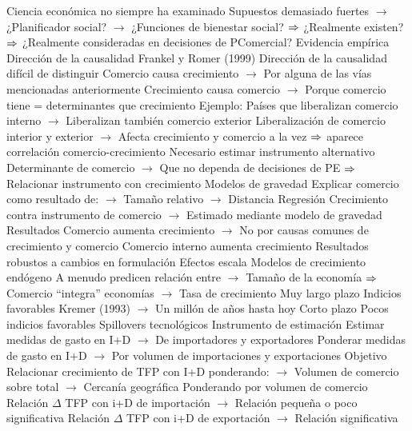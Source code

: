\documentclass{nuevotema}
\begin{document}
\begin{esquemal}
				\4 Ciencia económica no siempre ha examinado
				\4[] Supuestos demasiado fuertes
				\4[] $\to$ ¿Planificador social?
				\4[] $\to$ ¿Funciones de bienestar social?
				\4[] $\Rightarrow$ ¿Realmente existen?
				\4[] $\Rightarrow$ ¿Realmente consideradas en decisiones de PComercial?
		\2 Evidencia empírica
			\3 Dirección de la causalidad
				\4 Frankel y Romer (1999)
				\4 Dirección de la causalidad difícil de distinguir
				\4[] Comercio causa crecimiento
				\4[] $\to$ Por alguna de las vías mencionadas anteriormente
				\4[] Crecimiento causa comercio
				\4[] $\to$ Porque comercio tiene = determinantes que crecimiento
				\4 Ejemplo:
				\4[] Países que liberalizan comercio interno
				\4[] $\to$ Liberalizan también comercio exterior
				\4[] Liberalización de comercio interior y exterior
				\4[] $\to$ Afecta crecimiento y comercio a la vez
				\4[] $\Rightarrow$ aparece correlación comercio-crecimiento
				\4 Necesario estimar instrumento alternativo
				\4[] Determinante de comercio
				\4[] $\to$ Que no dependa de decisiones de PE
				\4[] $\Rightarrow$ Relacionar instrumento con crecimiento
				\4 Modelos de gravedad
				\4[] Explicar comercio como resultado de:
				\4[] $\to$ Tamaño relativo
				\4[] $\to$ Distancia
				\4 Regresión
				\4[] Crecimiento contra instrumento de comercio
				\4[] $\to$ Estimado mediante modelo de gravedad
				\4 Resultados
				\4[] Comercio aumenta crecimiento
				\4[] $\to$ No por causas comunes de crecimiento y comercio
				\4[] Comercio interno aumenta crecimiento
				\4[] Resultados robustos a cambios en formulación
			\3 Efectos escala
				\4 Modelos de crecimiento endógeno
				\4[] A menudo predicen relación entre
				\4[] $\to$ Tamaño de la economía
				\4[] $\Rightarrow$ Comercio ``integra'' economías
				\4[] $\to$ Tasa de crecimiento
				\4 Muy largo plazo
				\4[] Indicios favorables
				\4[] Kremer (1993)
				\4[] $\to$ Un millón de años hasta hoy
				\4 Corto plazo
				\4[] Pocos indicios favorables
			\3 Spillovers tecnológicos
				\4 Instrumento de estimación
				\4[] Estimar medidas de gasto en I+D
				\4[] $\to$ De importadores y exportadores
				\4[] Ponderar medidas de gasto en I+D
				\4[] $\to$ Por volumen de importaciones y exportaciones
				\4 Objetivo
				\4[] Relacionar crecimiento de TFP con I+D ponderando:
				\4[] $\to$ Volumen de comercio sobre total
				\4[] $\to$ Cercanía geográfica
				\4 Ponderando por volumen de comercio
				\4[] Relación $\Delta$ TFP con i+D de importación
				\4[] $\to$ Relación pequeña o poco significativa
				\4[] Relación $\Delta$ TFP con i+D de exportación
				\4[] $\to$ Relación significativa

\end{esquemal}
\end{document}
